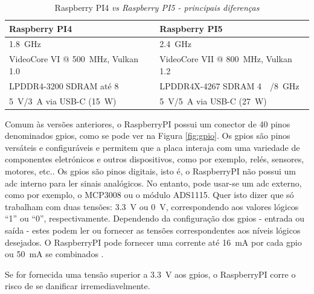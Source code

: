 \begin{table}[htb]
	\centering
	\caption{Raspberry PI4 \textit{vs Raspberry PI5 - principais diferenças} \cite{Raspberrypi5}}
	\label{Table:diferencasPI4PI5}
	\begin{tabular}{ll}
		\toprule
		Raspberry PI4                                            & Raspberry PI5                                             \\
		\midrule
		\SI{1.8}{\giga\hertz}                                    & \SI{2.4}{\giga\hertz}                                     \\
		\midrule
		VideoCore VI @ \SI{500}{\mega\hertz}, Vulkan 1.0         & VideoCore VII @ \SI{800}{\mega\hertz}, Vulkan 1.2         \\
		\midrule
		LPDDR4-3200 SDRAM até \SI{8}{\giga\byte}                 & LPDDR4X-4267 SDRAM \SI{4}{\giga\byte}/\SI{8}{\giga\hertz} \\
		\midrule
		\SI{5}{\volt}/\SI{3}{\ampere} via USB-C (\SI{15}{\watt}) & \SI{5}{\volt}/\SI{5}{\ampere} via USB-C (\SI{27}{\watt})  \\
		\bottomrule
	\end{tabular}
\end{table}

Comum às versões anteriores, o \gls{RaspberryPI} possui um conector de 40 pinos denominados \acrfull{gpio}s, como se pode ver na Figura \ref{fig:gpio}. Os \acrshort{gpio}s são pinos versáteis e configuráveis e permitem que a placa interaja com uma variedade de componentes eletrónicos e outros dispositivos, como por exemplo, relés, sensores, motores, etc.. Os \acrshort{gpio}s são pinos digitais, isto é, o \gls{RaspberryPI} não possui um \acrfull{adc} interno para ler sinais analógicos. No entanto, pode usar-se um \acrshort{adc} externo, como por exemplo, o MCP3008 ou o módulo ADS1115. Quer isto dizer que só trabalham com duas tensões: \SI{3.3}{\volt} ou \SI{0}{\volt}, correspondendo aos valores lógicos ``1'' ou ``0'', respectivamente.
Dependendo da configuração dos \acrshort{gpio}s - entrada ou saída - estes podem ler ou fornecer as tensões correspondentes aos níveis lógicos desejados. O \gls{RaspberryPI} pode fornecer uma corrente até \SI{16}{\milli\ampere} por cada \acrshort{gpio} ou \SI{50}{\milli\ampere} se combinados \cite{Raspberrytech}.

Se for fornecida uma tensão superior a \SI{3.3}{\volt} aos \acrshort{gpio}s, o \gls{RaspberryPI} corre o risco de se danificar irremediavelmente.

